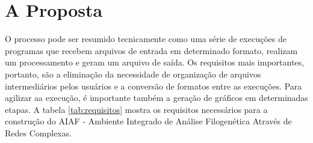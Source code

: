 \section{A Proposta} \label{sec:proposta}

O processo pode ser resumido tecnicamente como uma série de execuções de programas que recebem arquivos de entrada em determinado formato, realizam um
processamento e geram um arquivo de saída. Os requisitos mais importantes, portanto, são a eliminação da necessidade de organização de arquivos
intermediários pelos usuários e a conversão de formatos entre as execuções. Para agilizar aa execução, é importante também a geração de gráficos em
determinadas etapas. A tabela \ref{tab:requisitos} mostra os requisitos necessários para a construção do AIAF - Ambiente Integrado de Análise Filogenética
Através de Redes Complexas.

